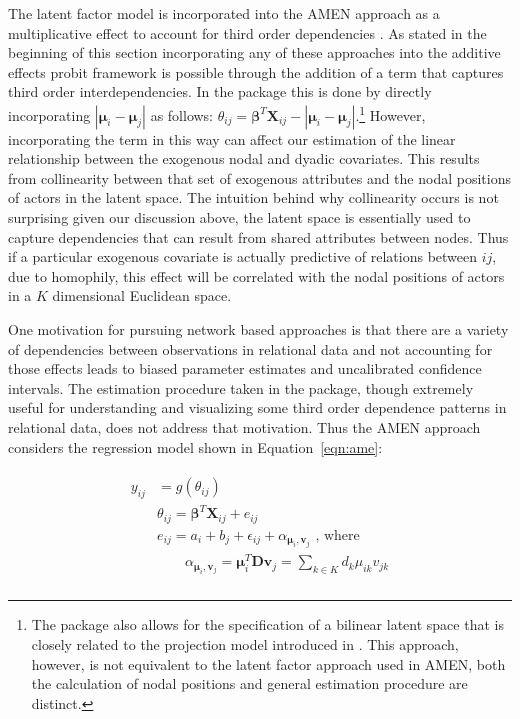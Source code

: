 The latent factor model is incorporated into the AMEN approach as a multiplicative effect to account for third order dependencies \citep{hoff:2009,hoff:etal:2015}. As stated in the beginning of this section incorporating any of these approaches into the additive effects probit framework is possible through the addition of a term that captures third order interdependencies. In the  package this is done by directly incorporating $|\bm\mu_{i} - \bm\mu_{j}|$ as follows: $\theta_{ij} = \bm\beta^{T} \mathbf{X}_{ij} - |\bm\mu_{i} - \bm\mu_{j}|$.\footnote{The  package also allows for the specification of a bilinear latent space that is closely related to the projection model introduced in \citet{hoff:etal:2002}. This approach, however, is not equivalent to the latent factor approach used in AMEN, both the calculation of nodal positions and general estimation procedure are distinct.} However, incorporating the term in this way can affect our estimation of the linear relationship between the exogenous nodal and dyadic covariates. This results from collinearity between that set of exogenous attributes and the nodal positions of actors in the latent space. The intuition behind why collinearity occurs is not surprising given our discussion above, the latent space is essentially used to capture dependencies that can result from shared attributes between nodes. Thus if a particular exogenous covariate is actually predictive of relations between $ij$, due to homophily, this effect will be correlated with the nodal positions of actors in a $K$ dimensional Euclidean space. 

One motivation  for pursuing network based approaches is that there are a variety of dependencies between observations in relational data and not accounting for those effects leads to biased parameter estimates and uncalibrated confidence intervals. The estimation procedure taken in the  package, though extremely useful for understanding and visualizing some third order dependence patterns in relational data, does not address that motivation. Thus the AMEN approach considers the regression model shown in Equation~\ref{eqn:ame}:

\begin{align}
\begin{aligned}
	y_{ij} &= g(\theta_{ij}) \\ 
	&\theta_{ij} = \bm\beta^{T} \mathbf{X}_{ij} + e_{ij} \\
	&e_{ij} = a_{i} + b_{j}  + \epsilon_{ij} + \alpha_{\bm\mu_{i}, \textbf{v}_{j}} \text{  , where } \\
	&\qquad \alpha_{\bm\mu_{i}, \textbf{v}_{j}} = \bm\mu_{i}^{T} \textbf{D} \textbf{v}_{j} = \sum_{k \in K} d_{k} \mu_{ik} v_{jk} \\ 
\label{eqn:ame}
\end{aligned}
\end{align}

